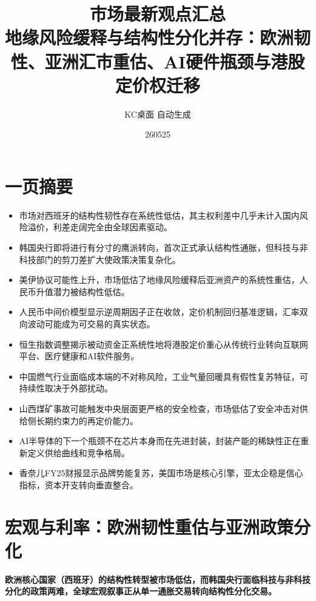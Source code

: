 \documentclass[11pt]{ctexart}
\title{\textbf{市场最新观点汇总}\\[0.4em]{\large 地缘风险缓释与结构性分化并存：欧洲韧性、亚洲汇市重估、AI硬件瓶颈与港股定价权迁移}}
\author{KC桌面 自动生成}
\date{260525}
\begin{document}
\maketitle
\section*{一页摘要}
\begin{itemize}
  \item 市场对西班牙的结构性韧性存在系统性低估，其主权利差中几乎未计入国内风险溢价，利差走阔完全由全球因素驱动。
  \item 韩国央行即将进行有分寸的鹰派转向，首次正式承认结构性通胀，但科技与非科技部门的剪刀差扩大使政策决策复杂化。
  \item 美伊协议可能性上升，市场低估了地缘风险缓释后亚洲资产的系统性重估，人民币升值潜力被结构性低估。
  \item 人民币中间价模型显示逆周期因子正在收敛，定价机制回归基准逻辑，汇率双向波动可能成为可交易的真实状态。
  \item 恒生指数调整揭示被动资金正系统性地将港股定价重心从传统行业转向互联网平台、医疗健康和AI软件服务。
  \item 中国燃气行业面临成本端的不对称风险，工业气量回暖具有假性复苏特征，可持续性取决于外部扰动。
  \item 山西煤矿事故可能触发中央层面更严格的安全检查，市场低估了安全冲击对供给侧长期约束力的再定价能力。
  \item AI半导体的下一个瓶颈不在芯片本身而在先进封装，封装产能的稀缺性正在重新定义供给曲线和竞争格局。
  \item 香奈儿FY25财报显示品牌势能复苏，美国市场是核心引擎，亚太企稳是信心指标，资本开支转向垂直整合。
\end{itemize}
\section{宏观与利率：欧洲韧性重估与亚洲政策分化}
\textbf{欧洲核心国家（西班牙）的结构性转型被市场低估，而韩国央行面临科技与非科技分化的政策两难，全球宏观叙事正从单一通胀交易转向结构性分化交易。}
\end{document}
